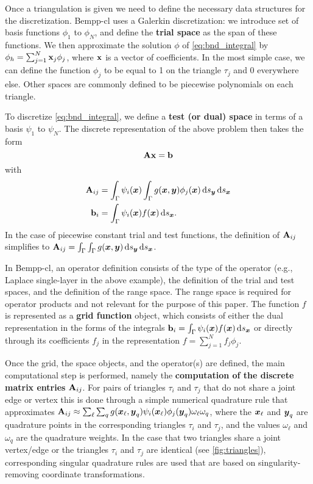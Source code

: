 Once a triangulation is given we need to define the necessary data structures for the discretization. Bempp-cl uses a Galerkin discretization: we introduce set of basis functions \(\phi_1\) to \(\phi_N\), and define the \textbf{trial space} as the span of these functions. We then approximate the solution \(\phi\) of \cref{eq:bnd_integral} by $\phi_h=\sum_{j=1}^N \mathbf{x}_j\phi_j$, where $\mathbf{x}$ is a vector of coefficients. In the most simple case, we can define the function \(\phi_j\) to be equal to 1 on the triangle $\tau_j$ and 0 everywhere else. Other spaces are commonly defined to be piecewise polynomials on each triangle.

To discretize \cref{eq:bnd_integral}, we define a \textbf{test (or dual) space} in terms of a basis \(\psi_1\) to \(\psi_N\). The discrete representation of the above problem then takes the form
$$
\mathbf{A}\mathbf{x} = \mathbf{b}
$$
with
\begin{align*}
\dmat{A}_{ij} &= \int_{\Gamma}\psi_i(\bx)\int_{\Gamma}g(\bx, \by)\phi_j(\bx)\ds[\by]\ds[\bx]\\
\dvec{b}_i &= \int_{\Gamma}\psi_i(\bx)f(\bx)\ds[\bx].
\end{align*}
In the case of piecewise constant trial and test functions, the definition of $\mathbf{A}_{ij}$ simplifies to $\dmat{A}_{ij} = \int_{\Gamma}\int_{\Gamma}g(\bx, \by)\ds[\by]\ds[\bx]$.

In Bempp-cl, an operator definition consists of the type of the operator (e.g., Laplace single-layer in the above example),
the definition of the trial and test spaces, and the definition of the range space. The range space is required for operator
products and not relevant for the purpose of this paper. The function $f$ is represented as a \textbf{grid function} object, which
consists of either the dual representation in the forms of the integrals $\dvec{b}_i = \int_{\Gamma}\psi_i(\bx)f(\bx)\ds[\bx]$ or directly through its coefficients $f_j$ in the representation $f=\sum_{j=1}^N f_j\phi_j$.

Once the grid, the space objects, and the operator(s) are defined, the main computational step is performed, namely the \textbf{computation of the discrete matrix entries} $\mathbf{A}_{ij}$. For pairs of triangles $\tau_i$ and $\tau_j$ that do not share a joint edge or vertex this is done through a simple numerical quadrature rule that approximates $\mathbf{A}_{ij}\approx \sum_{\ell}\sum_{q} g(\boldsymbol{x}_\ell, \boldsymbol{y}_q)\psi_i(\boldsymbol{x}_\ell)\phi_j(\boldsymbol{y}_q)\omega_\ell\omega_q$, where the $\boldsymbol{x}_\ell$ and $\boldsymbol{y}_q$ are quadrature points in the corresponding triangles $\tau_i$ and $\tau_j$, and the values $\omega_\ell$ and $\omega_q$ are the quadrature weights. In the case that two triangles share a joint vertex/edge or the triangles $\tau_i$ and $\tau_j$ are identical (see \cref{fig:triangles}), corresponding singular quadrature rules are used that are based on singularity-removing coordinate transformations.

